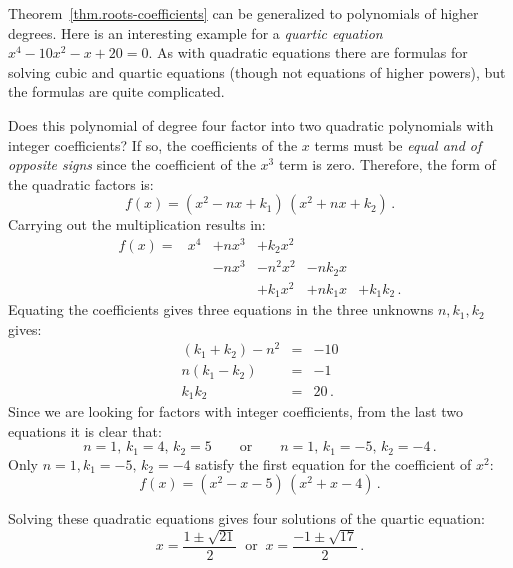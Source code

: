 \begin{example}
Theorem~\ref{thm.roots-coefficients} can be generalized to polynomials of higher degrees. Here is an interesting example for a \emph{quartic equation} $x^4-10x^2-x+20=0$. As with quadratic equations there are formulas for solving cubic and quartic equations (though not equations of higher powers), but the formulas are quite complicated.

Does this polynomial of degree four factor into two quadratic polynomials with integer coefficients? If so, the coefficients of the $x$ terms must be \emph{equal and of opposite signs} since the coefficient of the $x^3$ term is zero. Therefore, the form of the quadratic factors is:
\[
f(x) = (x^2 - nx + k_1)\, (x^2 + nx + k_2)\,.
\]
Carrying out the multiplication results in:
\[
\renewcommand{\arraystretch}{1.1}
\begin{array}{rrrrrr}
f(x) = &x^4 & + nx^3 & + k_2 x^2\\
&& -nx^3 &- n^2x^2 &-nk_2x\\
&&&+k_1x^2 &+ nk_1x &+ k_1k_2\,.
\end{array}
\]
Equating the coefficients gives three equations in the three unknowns $n,k_1,k_2$ gives:
\begin{eqnarray*}
(k_1+k_2)-n^2 &=& -10\\
n(k_1-k_2) &=& -1\\
k_1k_2 &=& 20\,.
\end{eqnarray*}
Since we are looking for factors with integer coefficients, from the last two equations it is clear that:
\[
n=1,\,k_1=4,\,k_2=5  \quad\quad\textrm{or} \quad\quad n=1,\,k_1=-5,\, k_2=-4\,.
\]
Only $n=1,k_1=-5,\, k_2=-4$ satisfy the first equation for the coefficient of $x^2$:
\[
f(x) = (x^2 - x - 5)\, (x^2 + x - 4)\,.
\]

\newpage

Solving these quadratic equations gives four solutions of the quartic equation:
\[
x = \frac{1\pm\sqrt{21}}{2}  \;\;\textrm{or} \;\; x= \frac{-1\pm\sqrt{17}}{2} \,.
\]
\end{example}

